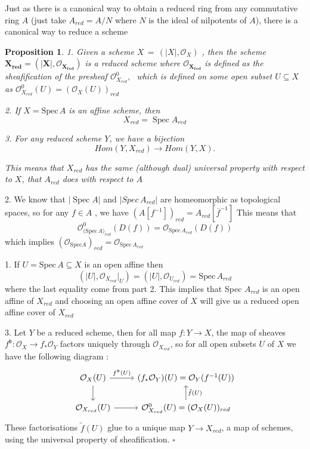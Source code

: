 \documentclass{article}
\newtheorem{proposition}[theorem]{Proposition}
\newenvironment{Proof}{{\noindent \indent \it Proof:\quad}}{\hfill $\square$\par}
\begin{document}
Just as there is a canonical way to obtain a reduced ring from any commutative ring $A$ (just take $A_{r e d}=A/N$ where $N$ is the ideal of nilpotents of $A$),  there is a canonical way to reduce a scheme 

\begin{proposition}
1. Given a scheme $X\,=\,(|X|,{\mathcal O}_{X})$ , then the scheme $\bm{X_{r e d}=(|X|,{\mathcal O}_{X_{red}})}$ is a reduced scheme where $\bm{\mathcal O_{X_{red}}}$ is defined as the sheafification of the presheaf ${\mathcal{O}}_{X_{r e d}}^{0},\;$ which is defined
on some open subset $U\subseteq X$ as  
${\mathcal{O}}_{X_{r e d}}^{0}(U)=({\mathcal{O}}_{X}(U))_{r e d}$ 

2. If $X={\mathrm{Spec}}\,A$ is an affine scheme, then
$$
X_{r e d}=\operatorname{Spec}A_{r e d}
$$

3. For any reduced scheme $Y$, we have a bijection
$$
H o m(Y,X_{r e d})\longrightarrow H o m(Y,X). 
$$

This means that $X_{r e d}$ has the same (although dual) universal property with respect to $X$, that $A_{red}$ does with respect to $A$ 
\end{proposition}
\begin{Proof}
2. We know that $|\operatorname{Spec}A|$ and $|Spec\,A_{r e d}|$ are homeomorphic as topological spaces, so for any $f\in A$ , we have $(A[f^{-1}])_{r e d}=A_{r e d}[\overline{{{f}}}^{-1}]$  This means that
$$
{\mathcal{O}}_{\mathrm{(Spec}\,A)_{r e d}}^{0}(D(f))={\mathcal{O}}_{\mathrm{Spec}\,A_{red}}(D(f))
$$ 
which implies $({\mathcal O}_{\mathrm{Spec}A})_{r e d}={\mathcal O}_{\mathrm{Spec}\,A_{r e d}}$ 

1. If $U={\mathrm{Spec}}\,A\subseteq X$ is an open affine then
$$
(|U|,{\mathcal{O}}_{X_{r e d}}|_U)=(|U|,{\mathcal{O}}_{U_{r e d}})={\mathrm{Spec}}\,A_{r e d} 
$$
where the last equality come from part 2. This implies that Spec $A_{r e d}$ is an open affine of $X_{r e d}$ and choosing an open affine cover of $X$ will give us a reduced open affine cover of $X_{red}$ 

3. Let $Y$ be a reduced scheme, then for all map $f : Y \to X$, the map of sheaves $f^{\mathfrak b} :\mathcal O_X \to f_\ast\mathcal O_Y$
factors uniquely through $\mathcal O_{X_{red}}$, so for all open subsets $U$ of $X$ we have the following diagram :
\[\begin{tikzcd}
	{\mathcal O_{X}(U)} & {(f_\ast\mathcal O_Y)(U)=\mathcal O_Y(f^{-1}(U))} \\
	{\mathcal O_{X_{red}}(U)} & {\mathcal O_{X_{red}}^0(U)=(\mathcal O_{X}(U))_{red}}
	\arrow[from=1-1, to=2-1]
	\arrow[from=2-1, to=2-2]
	\arrow["{f^{\mathfrak b}(U)}", from=1-1, to=1-2]
	\arrow["{\tilde f(U)}"', from=2-2, to=1-2]
\end{tikzcd}\]
These factorisations $\tilde f(U)$ glue to a unique map $Y \rightarrow X_{red}$, a map of schemes, using the universal
property of sheafification.
\end{Proof}
\end{document}
